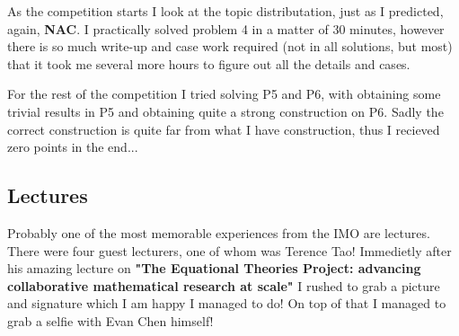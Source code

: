 \documentclass{article}
\begin{document}
As the competition starts I look at the topic distributation, just as I predicted, again, \textbf{NAC}. I practically solved problem 4 in a matter of \(30\) minutes, however there is so much write-up and case work required (not in all solutions, but most) that it took me several more hours to figure out all the details and cases.

For the rest of the competition I tried solving P5 and P6, with obtaining some trivial results in P5 and obtaining quite a strong construction on P6. Sadly the correct construction is quite far from what I have construction, thus I recieved zero points in the end...

\subsection{Lectures}

Probably one of the most memorable experiences from the IMO are lectures. There were four guest lecturers, one of whom was Terence Tao! Immedietly after his amazing lecture on \textbf{"The Equational Theories Project: advancing collaborative mathematical research at scale"} I rushed to grab a picture and signature which I am happy I managed to do! On top of that I managed to grab a selfie with Evan Chen himself!
\end{document}
